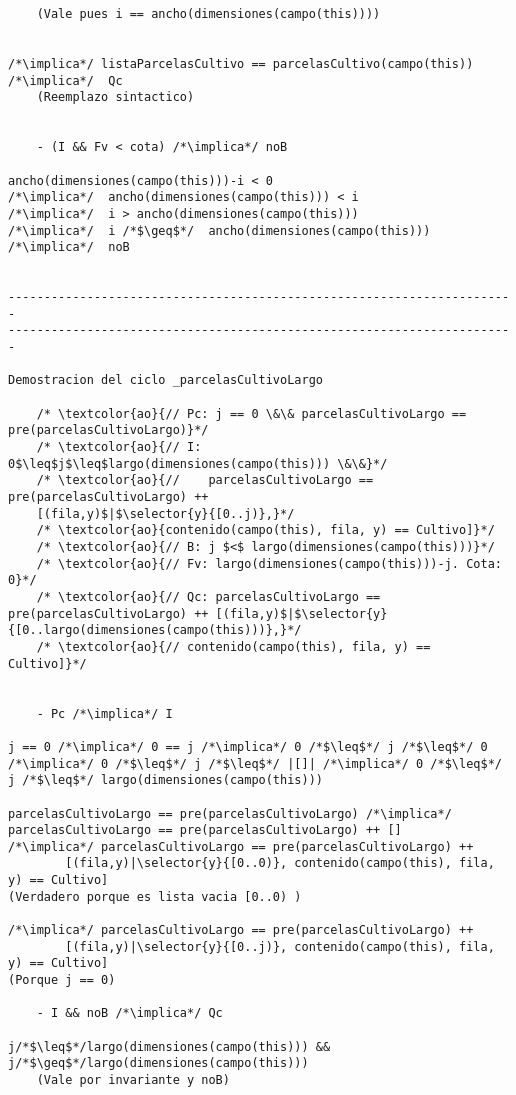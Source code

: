\begin{lstlisting}
	(Vale pues i == ancho(dimensiones(campo(this))))    


/*\implica*/ listaParcelasCultivo == parcelasCultivo(campo(this))  /*\implica*/  Qc
	(Reemplazo sintactico)
	
	
    - (I && Fv < cota) /*\implica*/ noB
    
ancho(dimensiones(campo(this)))-i < 0
/*\implica*/  ancho(dimensiones(campo(this))) < i
/*\implica*/  i > ancho(dimensiones(campo(this)))
/*\implica*/  i /*$\geq$*/  ancho(dimensiones(campo(this))) /*\implica*/  noB

	
-----------------------------------------------------------------------
-----------------------------------------------------------------------

Demostracion del ciclo _parcelasCultivoLargo

	/* \textcolor{ao}{// Pc: j == 0 \&\& parcelasCultivoLargo == pre(parcelasCultivoLargo)}*/      
	/* \textcolor{ao}{// I: 0$\leq$j$\leq$largo(dimensiones(campo(this))) \&\&}*/        
	/* \textcolor{ao}{//    parcelasCultivoLargo == pre(parcelasCultivoLargo) ++ 
    [(fila,y)$|$\selector{y}{[0..j)},}*/
    /* \textcolor{ao}{contenido(campo(this), fila, y) == Cultivo]}*/ 
    /* \textcolor{ao}{// B: j $<$ largo(dimensiones(campo(this)))}*/
	/* \textcolor{ao}{// Fv: largo(dimensiones(campo(this)))-j. Cota: 0}*/     
    /* \textcolor{ao}{// Qc: parcelasCultivoLargo == pre(parcelasCultivoLargo) ++ [(fila,y)$|$\selector{y}{[0..largo(dimensiones(campo(this)))},}*/
    /* \textcolor{ao}{// contenido(campo(this), fila, y) == Cultivo]}*/      


    - Pc /*\implica*/ I
   
j == 0 /*\implica*/ 0 == j /*\implica*/ 0 /*$\leq$*/ j /*$\leq$*/ 0
/*\implica*/ 0 /*$\leq$*/ j /*$\leq$*/ |[]| /*\implica*/ 0 /*$\leq$*/ j /*$\leq$*/ largo(dimensiones(campo(this)))

parcelasCultivoLargo == pre(parcelasCultivoLargo) /*\implica*/ 
parcelasCultivoLargo == pre(parcelasCultivoLargo) ++ []
/*\implica*/ parcelasCultivoLargo == pre(parcelasCultivoLargo) ++ 
		[(fila,y)|\selector{y}{[0..0)}, contenido(campo(this), fila, y) == Cultivo]
(Verdadero porque es lista vacia [0..0) )

/*\implica*/ parcelasCultivoLargo == pre(parcelasCultivoLargo) ++ 
		[(fila,y)|\selector{y}{[0..j)}, contenido(campo(this), fila, y) == Cultivo]
(Porque j == 0)

    - I && noB /*\implica*/ Qc

j/*$\leq$*/largo(dimensiones(campo(this))) && j/*$\geq$*/largo(dimensiones(campo(this)))
	(Vale por invariante y noB)


\end{lstlisting}
